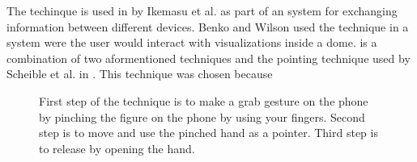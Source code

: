The \grab techinque is used in  by Ikemasu et al. as part of an system for exchanging information between different devices. Benko and Wilson  used the \grab technique in a system were the user would interact with visualizations inside a dome. \grab is a combination of two aformentioned techniques and the pointing technique used by Scheible et al. in . This technique was chosen because  

\begin{figure}[H]
	\caption{\protect{} First step of the \grab technique is to make a grab gesture on the phone by pinching the figure on the phone by using your fingers. \protect{} Second step is to move and use the pinched hand as a pointer. \protect{} Third step is to release by opening the hand.}
	\label{fig:pinchTechnique}
\end{figure}
